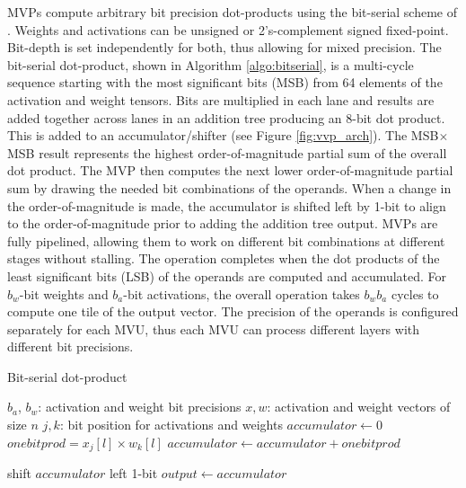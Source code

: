 \documentclass[sigconf]{acmart}
\newcommand{\MVU}{MVU}
\begin{document}
MVPs compute arbitrary bit precision dot-products using the bit-serial scheme of \cite{bilaniuk2019bitslice}. Weights and activations can be unsigned or 2's-complement signed fixed-point. Bit-depth is set independently for both, thus allowing for mixed precision. The bit-serial dot-product, shown in Algorithm \ref{algo:bitserial}, is a multi-cycle sequence starting with the most significant bits (MSB) from 64 elements of the activation and weight tensors. Bits are multiplied in each lane and results are added together across lanes in an addition tree producing an 8-bit dot product. This is added to an accumulator/shifter (see Figure \ref{fig:vvp_arch}). The MSB$\times$MSB result represents the highest order-of-magnitude partial sum of the overall dot product. The MVP then computes the next lower order-of-magnitude partial sum by drawing the needed bit combinations of the operands. When a change in the order-of-magnitude is made, the accumulator is shifted left by 1-bit to align to the order-of-magnitude prior to adding the addition tree output. MVPs are fully pipelined, allowing them to work on different bit combinations at different stages without stalling. The operation completes when the dot products of the least significant bits (LSB) of the operands are computed and accumulated. For $b_w$-bit weights and $b_a$-bit activations, the overall operation takes $b_w b_a$ cycles to compute one tile of the output vector. The precision of the operands is configured separately for each \MVU{}, thus each \MVU{} can process different layers with different bit precisions.

\begin{algorithm}
\caption{Bit-serial dot-product}\label{algo:bitserial}
\begin{algorithmic}[1]
\STATE $b_a$, $b_w$: activation and weight bit precisions
\STATE $x, w$: activation and weight vectors of size $n$
\STATE $j, k$: bit position for activations and weights
\STATE $accumulator \gets 0$
            \STATE $onebitprod = x_j[l] \times w_k[l]$
            \STATE $accumulator \gets accumulator + onebitprod$
        \ENDFOR
    \ENDFOR
    \item shift $accumulator$ left 1-bit
\ENDFOR
\STATE $output \gets accumulator$
\end{algorithmic}
\end{algorithm}
\end{document}
